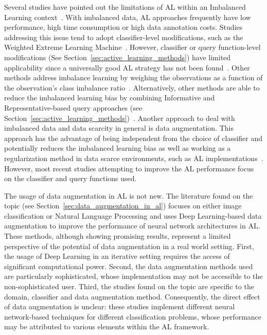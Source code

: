 \documentclass[preprint, 12pt]{elsarticle}
\begin{document}
Several studies have pointed out the limitations of AL within an Imbalanced
Learning context~\cite{Yu2019}. With imbalanced data, AL approaches frequently
have low performance, high time consumption or high data annotation costs.
Studies addressing this issue tend to adopt classifier-level modifications,
such as the Weighted Extreme Learning Machine~\cite{Yu2019, Zong2013,
Qin2021}. However, classifier or query function-level modifications (See
Section~\ref{sec:active_learning_methods}) have limited applicability since a
universally good AL strategy has not been found~\cite{Sener2018}. Other
methods address imbalance learning by weighing the observations as a function
of the observation's class imbalance ratio~\cite{Liu2021}. Alternatively,
other methods are able to reduce the imbalanced learning bias by combining
Informative and Representative-based query approaches (see
Section~\ref{sec:active_learning_methods})~\cite{Tharwat2020}. Another
approach to deal with imbalanced data and data scarcity in general is data
augmentation. This approach has the advantage of being independent from the
choice of classifier and potentially reduces the imbalanced learning bias as
well as working as a regularization method in data scarce environments, such
as AL implementations~\cite{Kim2021}. However, most recent studies attempting
to improve the AL performance focus on the classifier and query functions
used.
 
The usage of data augmentation in AL is not new. The literature found on the
topic (see Section~\ref{sec:data_augmentation_in_al}) focuses on either image
classification or Natural Language Processing and uses Deep Learning-based
data augmentation to improve the performance of neural network architectures
in AL\@. These methods, although showing promising results, represent a
limited perspective of the potential of data augmentation in a real world
setting. First, the usage of Deep Learning in an iterative setting requires
the access of significant computational power. Second, the data augmentation
methods used are particularly sophisticated, whose implementation may not be
accessible to the non-sophisticated user. Third, the studies found on the
topic are specific to the domain, classifier and data augmentation method.
Consequently, the direct effect of data augmentation is unclear: these studies
implement different neural network-based techniques for different
classification problems, whose performance may be attributed to various
elements within the AL framework.
\end{document}
